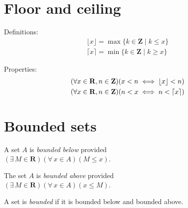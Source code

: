 \documentclass[letterpaper,landscape,9pt,fleqn]{extarticle}
\newcommand{\reals}{\mathbf{R}}
\newcommand{\integers}{\mathbf{Z}}
\DeclarePairedDelimiter{\parens}{\lparen}{\rparen}
\begin{document}
\begin{multicols*}{3}
\section*{Floor and ceiling}

\noindent Definitions:
\begin{align*}
    \lfloor x \rfloor = \max \{k \in \integers \mid  k \leq x \} \\
    \lceil x \rceil = \min  \{k \in \integers \mid  k \geq x \}   
\end{align*}

\noindent Properties:
\begin{align*}
   & \parens*{\forall x \in \reals, n \in \integers} \parens*{x < n \iff  \lfloor x \rfloor < n}\\
   & \parens*{\forall x \in \reals, n \in \integers} \parens*{n < x \iff  n < \lceil  x \rceil}\\
\end{align*}
  
\section*{Bounded sets}
\begin{description}[\itemsep=0em]
    \item[Bounded below] A set $A$ is \emph{bounded below} provided\\
        \((\exists \, M \in \reals)(\forall \, x \in A)(M \leq x)\).

    \item[Bounded above] The set $A$ is \emph{bounded above} provided\\
        \((\exists \, M \in \reals)(\forall \, x \in A)(x \leq M ) \).
        
    \item[Bounded] A set is \emph{bounded} if it is bounded below and bounded above.

\end{description}


\end{multicols*}
\end{document}
